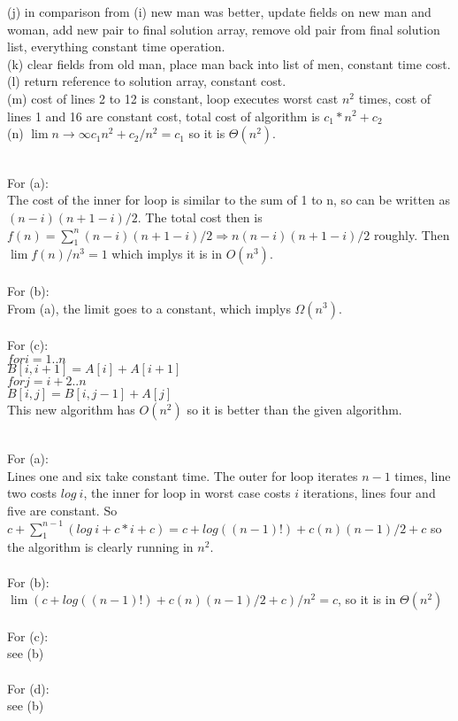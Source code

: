 \documentclass{assignment}
\begin{document}
\begin{problemlist}
\begin{answer}
(j) in comparison from (i) new man was better, update fields on new man and woman, add new pair to final solution array, remove old pair from final solution list, everything constant time operation.\\
(k) clear fields from old man, place man back into list of men, constant time cost.\\
(l) return reference to solution array, constant cost.\\
(m) cost of lines 2 to 12 is constant, loop executes worst cast $n^2$ times, cost of lines 1 and 16 are constant cost, total cost of algorithm is $c_1*n^2 + c_2$\\
(n) $\lim {n\rightarrow \infty} c_1n^2+c_2/n^2 = c_1$ so it is $\Theta (n^2)$.
\end{answer}
\pbitem
\begin{problem}
\end{problem}
\begin{answer}
\\
For (a):\\
The cost of the inner for loop is similar to the sum of 1 to n, so can be written as $(n-i)(n+1-i)/2$. The total cost then is $f(n)=\sum_1^n (n-i)(n+1-i)/2 \Rightarrow n(n-i)(n+1-i)/2$ roughly. Then $\lim f(n)/n^3 = 1$ which implys it is in $O(n^3)$.\\
\\For (b):\\
From (a), the limit goes to a constant, which implys $\Omega (n^3)$.\\
\\For (c):\\
$for i=1..n$\\
$B[i,i+1]=A[i]+A[i+1]$\\
$for j = i+2..n$\\
$B[i,j]=B[i,j-1]+A[j]$\\
This new algorithm has $O(n^2)$ so it is better than the given algorithm.\\
\end{answer}
\pbitem
\begin{problem}
\end{problem}
\begin{answer}
\\
For (a):\\
Lines one and six take constant time. The outer for loop iterates $n-1$ times, line two costs $log~i$, the inner for loop in worst case costs $i$ iterations, lines four and five are constant. So $c + \sum_1^{n-1} (log~i + c*i + c) = c + log((n-1)!) + c(n)(n-1)/2 + c$ so the algorithm is clearly running in $n^2$.\\
\\For (b):\\
$\lim (c + log((n-1)!) + c(n)(n-1)/2 + c)/n^2 = c$, so it is in $\Theta (n^2)$\\
\\For (c):\\
see (b)\\
\\For (d):\\
see (b)\\
\end{answer}
\end{problemlist}
\end{document}
